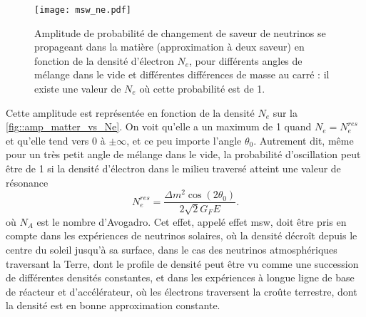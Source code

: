         \begin{figure}[!htb]
          \centering
          \texttt{[image: msw\_ne.pdf]}
          \caption[L'effet de résonnance MSW]{\label{fig::amp_matter_vs_Ne}Amplitude de probabilité de changement de saveur de neutrinos se propageant dans la matière (approximation à deux saveur) en fonction de la densité d'électron $N_e$, pour différents angles de mélange dans le vide et différentes différences de masse au carré : il existe une valeur de $N_e$ où cette probabilité est de 1.}
        \end{figure}
        Cette amplitude est représentée en fonction de la densité $N_e$ sur la \autoref{fig::amp_matter_vs_Ne}. On voit qu'elle a un maximum de 1 quand $N_e = N_e^{res}$ et qu'elle tend vers 0 à $\pm\infty$, et ce peu importe l'angle $\theta_0$. Autrement dit, même pour un très petit angle de mélange dans le vide, la probabilité d'oscillation peut être de 1 si la densité d'électron dans le milieu traversé atteint une valeur de résonance
        \begin{equation}\label{eq::MSW_condition}
          N_e^{res}  =\frac{\Delta m^2\cos(2\theta_0)}{2\sqrt{2}G_F E}.
        \end{equation}
        où $N_A$ est le nombre d'Avogadro.
        Cet effet, appelé effet \gls{msw}, doit être pris en compte dans les expériences de neutrinos solaires, où la densité décroît depuis le centre du soleil jusqu'à sa surface, dans le cas des neutrinos atmosphériques traversant la Terre, dont le profile de densité peut être vu comme une succession de différentes densités constantes, et dans les expériences à longue ligne de base de réacteur et d'accélérateur, où les électrons traversent la croûte terrestre, dont la densité est en bonne approximation constante.
        
        
